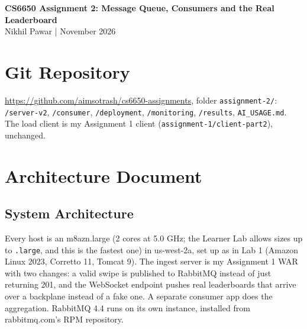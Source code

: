 \documentclass[10pt]{article}
\begin{document}
\begin{center}
{\Large\bfseries CS6650 Assignment 2: Message Queue, Consumers and the Real Leaderboard}\\[4pt]
Nikhil Pawar \quad | \quad November 2026
\end{center}

\section{Git Repository}
\url{https://github.com/aimsotrash/cs6650-assignments}, folder \texttt{assignment-2/}:\\
\texttt{/server-v2}, \texttt{/consumer}, \texttt{/deployment}, \texttt{/monitoring}, \texttt{/results}, \texttt{AI\_USAGE.md}. The load client is my Assignment 1 client (\texttt{assignment-1/client-part2}), unchanged.

\section{Architecture Document}

\subsection{System Architecture}
Every host is an m8azn.large (2 cores at 5.0 GHz; the Learner Lab allows sizes up to \texttt{.large}, and this is the fastest one) in us-west-2a, set up as in Lab 1 (Amazon Linux 2023, Corretto 11, Tomcat 9). The ingest server is my Assignment 1 WAR with two changes: a valid swipe is published to RabbitMQ instead of just returning 201, and the WebSocket endpoint pushes real leaderboards that arrive over a backplane instead of a fake one. A separate consumer app does the aggregation. RabbitMQ 4.4 runs on its own instance, installed from rabbitmq.com's RPM repository.
\end{document}
